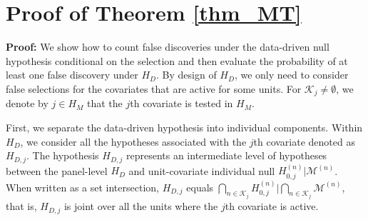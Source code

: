 \documentclass[11pt]{article}
\begin{document}


\section{Proof of Theorem \ref{thm_MT}}\label{app:proof}

\textbf{Proof:} We show how to count false discoveries under the data-driven null hypothesis conditional on the selection and then evaluate the probability of at least one false discovery under $H_D$. By design of $H_D$, we only need to consider false selections for the covariates that are active for some units. For $\mathcal{K}_j\neq \emptyset$, we denote by $j\in H_M$ that the $j$th covariate is tested in $H_M$. 

First, we separate the data-driven hypothesis into individual components. Within $H_D$, we consider all the hypotheses associated with the $j$th covariate denoted as $H_{D,j}$. The hypothesis $H_{D,j}$ represents an intermediate level of hypotheses between the panel-level $H_D$ and unit-covariate individual null $H_{0,j}^{(n)}|\mathcal{M}^{(n)}$. When written as a set intersection, $H_{D,j}$ equals $\bigcap_{n\in\mathcal{K}_j}H_{0,j}^{(n)}|\bigcap_{n\in \mathcal{K}_j}\mathcal{M}^{(n)}$, that is, $H_{D,j}$ is joint over all the units where the $j$th covariate is active. 
\end{document}
